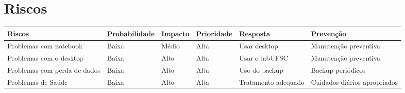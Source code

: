 \documentclass[12pt]{article}
\begin{document}
\section{Riscos}    
    \begin{tabular}{|p{2.5cm}|p{2.5cm}|p{2.5cm}|p{2.5cm}|p{2.5cm}|p{2.5cm}|}
    	\hline
    	Riscos					& Probabilidade	&	Impacto	&	Prioridade	&	Resposta				& Prevenção \\
    	\hline
    	\hline
    	Problemas com notebook		& Baixa			&	Médio	&	Alta		&   Usar desktop  & Manutenção preventiva \\
    	\hline
    	Problemas com o desktop   &   Baixa   &   Alto    & Alta    &   Usar o labUFSC  & Manutenção preventiva \\
    	\hline
    	Problemas com perda de dados				& Baixa			&	Alto	&	Alta		&	Uso do backup	& Backup periódicos\\
    	\hline
    	Problemas de Saúde		& Baixa			&	Alto	&	Alta		&	Tratamento adequado		& Cuidados diários apropriados		 \\
    	\hline
    \end{tabular}
\newpage



 
\end{document}
